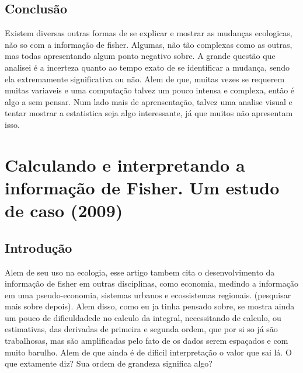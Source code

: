 \subsection{Conclusão}
Existem diversas outras formas de se explicar e mostrar as mudanças ecologicas, não so com a
informação de fisher. Algumas, não tão complexas como as outras, mas todas apresentando algum ponto
negativo sobre. A grande questão que analisei é a incerteza quanto ao tempo exato de se identificar
a mudança, sendo ela extremamente significativa ou não. Alem de que, muitas vezes se requerem muitas
variaveis e uma computação talvez um pouco intensa e complexa, então é algo a sem pensar. Num lado
mais de aprensentação, talvez uma analise visual e tentar mostrar a estatistica seja algo
interessante, já que muitos não apresentam isso.
\section{Calculando e interpretando a informação de Fisher. Um estudo de caso (2009)}
\subsection{Introdução}
Alem de seu uso na ecologia, esse artigo tambem cita o desenvolvimento da informação de fisher em
outras disciplinas, como economia, medindo a informação em uma pseudo-economia, sistemas urbanos e
ecossistemas regionais. (pesquisar mais sobre depois). Alem disso, como eu ja tinha pensado sobre,
se mostra ainda um pouco de dificuldadede no calculo da integral, necessitando de calculo, ou
estimativas, das derivadas de primeira e segunda ordem, que por si so já são trabalhosas, mas são
amplificadas pelo fato de os dados serem espaçados e com muito barulho. Alem de que ainda é de
dificil interpretação o valor que sai lá. O que extamente diz? Sua ordem de grandeza significa algo?
